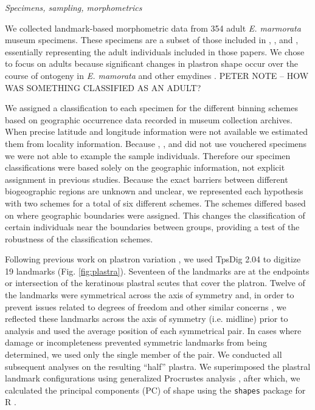 \documentclass[12pt,letterpaper]{article}
\renewcommand{\subsection}[1]{%
\bigskip
\begin{center}
\begin{large}
\normalfont\itshape #1
\end{large}
\end{center}}
\begin{document}
\subsection{Specimens, sampling, morphometrics}
We collected landmark-based morphometric data from 354 adult \textit{E. marmorata} museum specimens. These specimens are a subset of those included in \citet{Angielczyk2007}, \citet{Angielczyk2011}, and \citet{Angielczyk2013a}, essentially representing the adult individuals included in those papers. We chose to focus on adults because significant changes in plastron shape occur over the course of ontogeny in \textit{E. mamorata} and other emydines \citep{Angielczyk2013a}. \uppercase{Peter note -- how was something classified as an adult?}

We assigned a classification to each specimen for the different binning schemes based on geographic occurrence data recorded in museum collection archives. When precise latitude and longitude information were not available we estimated them from locality information. Because \citet{Spinks2005}, \citet{Spinks2010}, and \citet{Spinks20140} did not use vouchered specimens we were not able to example the sample individuals. Therefore our specimen classifications were based solely on the geographic information, not explicit assignment in previous studies. Because the exact barriers between different biogeographic regions are unknown and unclear, we represented each hypothesis with two schemes for a total of six different schemes. The schemes differed based on where geographic boundaries were assigned. This changes the classification of certain individuals near the boundaries between groups, providing a test of the robustness of the classification schemes.

Following previous work on plastron variation \citep{Angielczyk2007,Angielczyk2011,Angielczyk2013a}, we used TpsDig 2.04 \citep{Rohlf2005} to digitize 19 landmarks (Fig. \ref{fig:plastra}). Seventeen of the landmarks are at the endpoints or intersection of the keratinous plastral scutes that cover the platron. Twelve of the landmarks were symmetrical across the axis of symmetry and, in order to prevent issues related to degrees of freedom and other similar concerns \citep{Klingenberg2002}, we reflected these landmarks across the axis of symmetry (i.e. midline) prior to analysis and used the average position of each symmetrical pair. In cases where damage or incompleteness prevented symmetric landmarks from being determined, we used only the single member of the pair. We conducted all subsequent analyses on the resulting ``half'' plastra. We superimposed the plastral landmark configurations using generalized Procrustes analysis \citep{Dryden1998a}, after which, we calculated the principal components (PC) of shape using the \texttt{shapes} package for R \citep{2013,Dryden2013}.
\end{document}
